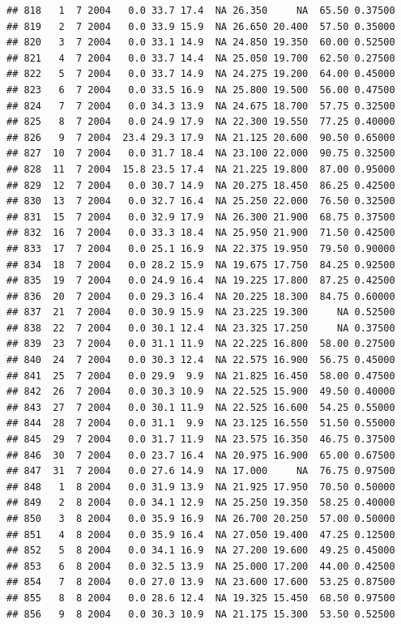 \documentclass[
]{book}
\begin{document}
\begin{verbatim}
## 818   1  7 2004   0.0 33.7 17.4  NA 26.350     NA  65.50 0.37500
## 819   2  7 2004   0.0 33.9 15.9  NA 26.650 20.400  57.50 0.35000
## 820   3  7 2004   0.0 33.1 14.9  NA 24.850 19.350  60.00 0.52500
## 821   4  7 2004   0.0 33.7 14.4  NA 25.050 19.700  62.50 0.27500
## 822   5  7 2004   0.0 33.7 14.9  NA 24.275 19.200  64.00 0.45000
## 823   6  7 2004   0.0 33.5 16.9  NA 25.800 19.500  56.00 0.47500
## 824   7  7 2004   0.0 34.3 13.9  NA 24.675 18.700  57.75 0.32500
## 825   8  7 2004   0.0 24.9 17.9  NA 22.300 19.550  77.25 0.40000
## 826   9  7 2004  23.4 29.3 17.9  NA 21.125 20.600  90.50 0.65000
## 827  10  7 2004   0.0 31.7 18.4  NA 23.100 22.000  90.75 0.32500
## 828  11  7 2004  15.8 23.5 17.4  NA 21.225 19.800  87.00 0.95000
## 829  12  7 2004   0.0 30.7 14.9  NA 20.275 18.450  86.25 0.42500
## 830  13  7 2004   0.0 32.7 16.4  NA 25.250 22.000  76.50 0.32500
## 831  15  7 2004   0.0 32.9 17.9  NA 26.300 21.900  68.75 0.37500
## 832  16  7 2004   0.0 33.3 18.4  NA 25.950 21.900  71.50 0.42500
## 833  17  7 2004   0.0 25.1 16.9  NA 22.375 19.950  79.50 0.90000
## 834  18  7 2004   0.0 28.2 15.9  NA 19.675 17.750  84.25 0.92500
## 835  19  7 2004   0.0 24.9 16.4  NA 19.225 17.800  87.25 0.42500
## 836  20  7 2004   0.0 29.3 16.4  NA 20.225 18.300  84.75 0.60000
## 837  21  7 2004   0.0 30.9 15.9  NA 23.225 19.300     NA 0.52500
## 838  22  7 2004   0.0 30.1 12.4  NA 23.325 17.250     NA 0.37500
## 839  23  7 2004   0.0 31.1 11.9  NA 22.225 16.800  58.00 0.27500
## 840  24  7 2004   0.0 30.3 12.4  NA 22.575 16.900  56.75 0.45000
## 841  25  7 2004   0.0 29.9  9.9  NA 21.825 16.450  58.00 0.47500
## 842  26  7 2004   0.0 30.3 10.9  NA 22.525 15.900  49.50 0.40000
## 843  27  7 2004   0.0 30.1 11.9  NA 22.525 16.600  54.25 0.55000
## 844  28  7 2004   0.0 31.1  9.9  NA 23.125 16.550  51.50 0.55000
## 845  29  7 2004   0.0 31.7 11.9  NA 23.575 16.350  46.75 0.37500
## 846  30  7 2004   0.0 23.7 16.4  NA 20.975 16.900  65.00 0.67500
## 847  31  7 2004   0.0 27.6 14.9  NA 17.000     NA  76.75 0.97500
## 848   1  8 2004   0.0 31.9 13.9  NA 21.925 17.950  70.50 0.50000
## 849   2  8 2004   0.0 34.1 12.9  NA 25.250 19.350  58.25 0.40000
## 850   3  8 2004   0.0 35.9 16.9  NA 26.700 20.250  57.00 0.50000
## 851   4  8 2004   0.0 35.9 16.4  NA 27.050 19.400  47.25 0.12500
## 852   5  8 2004   0.0 34.1 16.9  NA 27.200 19.600  49.25 0.45000
## 853   6  8 2004   0.0 32.5 13.9  NA 25.000 17.200  44.00 0.42500
## 854   7  8 2004   0.0 27.0 13.9  NA 23.600 17.600  53.25 0.87500
## 855   8  8 2004   0.0 28.6 12.4  NA 19.325 15.450  68.50 0.97500
## 856   9  8 2004   0.0 30.3 10.9  NA 21.175 15.300  53.50 0.52500

\end{verbatim}
\end{document}
